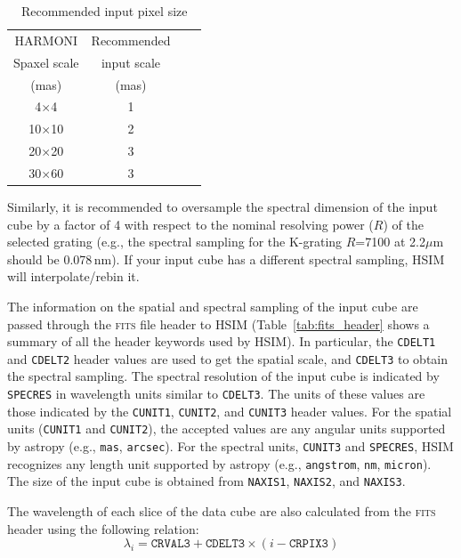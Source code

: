 \documentclass[12pt]{report}
\begin{document}
\begin{table}[h]
\centering
\caption{Recommended input pixel size}
\label{tab:scale}
\begin{tabular}{cccc}
\hline
HARMONI & Recommended\\
Spaxel scale & input scale\\
(mas) & (mas) \\
\hline
4$\times$4   & 1 \\
10$\times$10 & 2 \\
20$\times$20 & 3 \\
30$\times$60 & 3 \\
\hline
\end{tabular}
\end{table}

Similarly, it is recommended to oversample the spectral dimension of the input cube by a factor of 4 with respect to the nominal resolving power ($R$) of the selected grating (e.g., the spectral sampling for the K-grating $R$=7100 at 2.2$\mu$m should be 0.078\,nm). If your input cube has a different spectral sampling, HSIM will interpolate\slash rebin it. 

The information on the spatial and spectral sampling of the input cube are passed through the \textsc{fits} file header to HSIM (Table~\ref{tab:fits_header} shows a summary of all the header keywords used by HSIM). In particular, the \texttt{CDELT1} and \texttt{CDELT2} header values are used to get the spatial scale, and \texttt{CDELT3} to obtain the spectral sampling. The spectral resolution of the input cube is indicated by \texttt{SPECRES} in wavelength units similar to \texttt{CDELT3}. The units of these values are those indicated by the \texttt{CUNIT1}, \texttt{CUNIT2}, and \texttt{CUNIT3} header values. For the spatial units (\texttt{CUNIT1} and \texttt{CUNIT2}), the accepted values are any angular units supported by astropy (e.g., \texttt{mas}, \texttt{arcsec}). For the spectral units, \texttt{CUNIT3} and \texttt{SPECRES}, HSIM recognizes any length unit supported by astropy (e.g., \texttt{angstrom}, \texttt{nm}, \texttt{micron}). The size of the input cube is obtained from \texttt{NAXIS1}, \texttt{NAXIS2}, and \texttt{NAXIS3}.


The wavelength of each slice of the data cube are also calculated from the \textsc{fits} header using the following relation:
\begin{equation}\label{eq:lambda}
\lambda_i = \texttt{CRVAL3} + \texttt{CDELT3} \times (i - \texttt{CRPIX3})
\end{equation}
\end{document}
